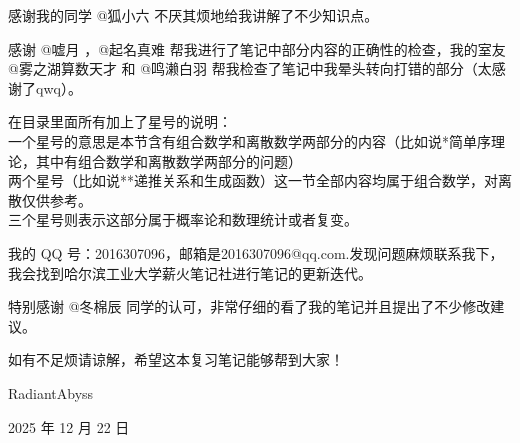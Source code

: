 \documentclass[oneside]{book}
\theoremstyle{definition}
\begin{document}
	感谢我的同学 @狐小六 不厌其烦地给我讲解了不少知识点。
	
	感谢 @嘘月 ，@起名真难 帮我进行了笔记中部分内容的正确性的检查，我的室友 @雾之湖算数天才 和 @鸣濑白羽 帮我检查了笔记中我晕头转向打错的部分（太感谢了qwq）。
	
	在目录里面所有加上了星号的说明：\\
	一个星号的意思是本节含有组合数学和离散数学两部分的内容（比如说*简单序理论，其中有组合数学和离散数学两部分的问题）\\
	两个星号（比如说**递推关系和生成函数）这一节全部内容均属于组合数学，对离散仅供参考。\\
	三个星号则表示这部分属于概率论和数理统计或者复变。

	
	我的 QQ 号：2016307096，邮箱是2016307096@qq.com.发现问题麻烦联系我下，我会找到哈尔滨工业大学薪火笔记社进行笔记的更新迭代。
	 
	特别感谢 @冬棉辰 同学的认可，非常仔细的看了我的笔记并且提出了不少修改建议。
	
	如有不足烦请谅解，希望这本复习笔记能够帮到大家！
	
	\hfill RadiantAbyss
	
	\hfill 2025 年 12 月 22 日
	 
	
	
	
	
	
	
	
	
	
\end{document}
